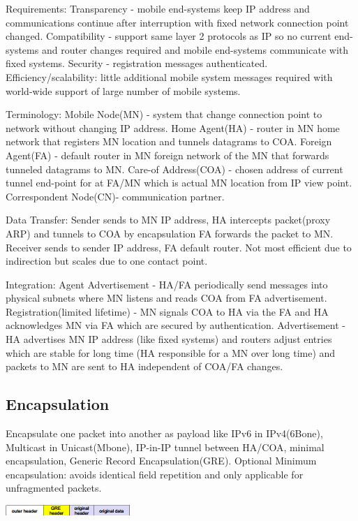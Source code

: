 \documentclass[8pt]{extarticle}
\begin{document}
\begin{multicols}{2}
Requirements: Transparency - mobile end-systems keep IP address and communications continue after interruption with fixed network connection point changed. Compatibility - support same layer 2 protocols as IP so no current end-systems and router changes required and mobile end-systems communicate with fixed systems. Security - registration messages authenticated. Efficiency/scalability: little additional mobile system messages required with world-wide support of large number of mobile systems.

Terminology: Mobile Node(MN) - system that change connection point to network without changing IP address. Home Agent(HA) - router in MN home network that registers MN location and tunnels datagrams to COA. Foreign Agent(FA) - default router in MN foreign network of the MN that forwards tunneled datagrams to MN. Care-of Address(COA) - chosen address of current tunnel end-point for at FA/MN which is actual MN location from IP view point. Correspondent Node(CN)- communication partner.

Data Transfer: Sender sends to MN IP address, HA intercepts packet(proxy ARP) and tunnels to COA by encapsulation FA forwards the packet to MN. Receiver sends to sender IP address, FA default router. Not most efficient due to indirection but scales due to one contact point.

Integration: Agent Advertisement - HA/FA periodically send messages into physical subnets where MN listens and reads COA from FA advertisement. Registration(limited lifetime) - MN signals COA to HA via the FA and HA acknowledges MN via FA which are secured by authentication. Advertisement - HA advertises MN IP address (like fixed systems) and routers adjust entries which are stable for long time (HA responsible for a MN over long time) and packets to MN are sent to HA independent of COA/FA changes.

\subsection{Encapsulation}

Encapsulate one packet into another as payload like IPv6 in IPv4(6Bone), Multicast in Unicast(Mbone), IP-in-IP tunnel between HA/COA, minimal encapsulation, Generic Record Encapsulation(GRE). Optional Minimum encapsulation: avoids identical field repetition and only applicable for unfragmented packets.

\includegraphics{gre.png}


\end{multicols}
\end{document}
